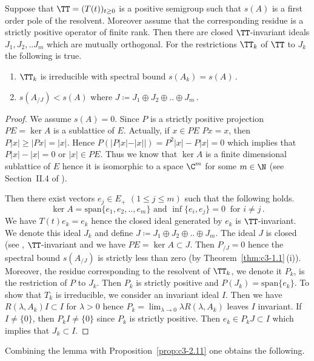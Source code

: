 \begin{lemma}\label{lem:c3-3.13}
	Suppose that $\TT = (T(t))_{t \ge 0}$ is a positive semigroup such that $s(A)$ is a first order pole of the resolvent. 
	Moreover assume that the corresponding residue is a strictly positive operator of finite rank.
	Then there are closed $\TT$-invariant ideals $J_{1},J_{2}, .. J_{m}$ which are mutually orthogonal. 
	For the restrictions  $\TT_{k}$ of\/ $\TT$ to $J_{k}$ the following is true.
	\begin{enumerate}[\upshape (i)]
		\item $\TT_{k}$ is irreducible with spectral bound $s(A_k) = s(A)$\,.
		\item $s(A_{/J}) < s(A)$  where $J \coloneqq  J_{1}\oplus J_{2}\oplus .. \oplus J_{m}\,.$
	\end{enumerate}
\end{lemma}
\begin{proof}
	We assume $s(A) = 0$. 
	Since $P$ is a strictly positive projection $PE = \ker A$ is a sublattice of\/ $E$. 
	Actually, if\/ $x \in PE$ \ie  $Px = x$, then $P|x| \geq |Px| = |x|$. 
	Hence $P(|P|x|-|x||) = P^{2}|x| - P|x| = 0$ which implies that $P|x| - |x| = 0$ or $|x| \in PE$.
	Thus we know that $\ker A$ is a finite dimensional sublattice of\/ $E$ hence it is isomorphic to a space $\C ^{m}$ for some $m \in \N$ (see Section~II.4 of \textcite{schaefer:1974}). 
	
	Then there exist vectors $e_{j} \in E_{+}$ $(1\leq j\leq m)$ such that the following holds.
	\begin{equation}\label{eq:c3-3.18}
		\ker A = \mathrm{span} \{e_{1},e_{2}, .. ,e_{m}\} \text{ and } \inf\{e_{i},e_{j}\} = 0 \ \text{ for }  i \neq j\,.
	\end{equation}
	We have $T(t)e_{k} = e_{k}$ hence the closed ideal generated by $e_{k}$ is $\TT$-invariant. 
	We denote this ideal $J_{k}$ and define $J\coloneqq  J_{1}\oplus J_{2}\oplus .. \oplus J_{m}$.
	The ideal $J$ is closed 
    (see \textcite[III Theorem~1.2]{schaefer:1974}, $\TT$-invariant and we have $PE = \ker A \subset J$. 
	Then $P_{/J} = 0$ hence the spectral bound $s(A_{/J})$
	is strictly less than zero (by Theorem~\ref{thm:c3-1.1}\,(i)). 
	Moreover, the residue corresponding to the resolvent of\/ $\TT_{k}$, we denote it $P_{k}$, is the restriction of\/ $P$ to $J_{k}$.
	Then $P_{k}$ is strictly positive and $P(J_{k}) = \mathrm{span}\{e_{k}\}$. 
	To show that $T_{k}$ is irreducible, we consider an invariant ideal $I$. 
	Then we have $R(\lambda,A_{k})I \subset I$ for $\lambda > 0$ hence $P_{k} = \lim_{\lambda \to 0}\lambda R(\lambda,A_{k})$ leaves $I$ invariant. 
	If\/ $I \neq \{0\}$, then $P_{k}I \neq \{0\}$ since $P_{k}$ is strictly positive. 
	Then $e_{k} \in P_{k}J \subset I$ which implies that $J_{k} \subset I$.
\end{proof}
Combining the lemma with Proposition~\ref{prop:c3-2.11} one obtains the following.

